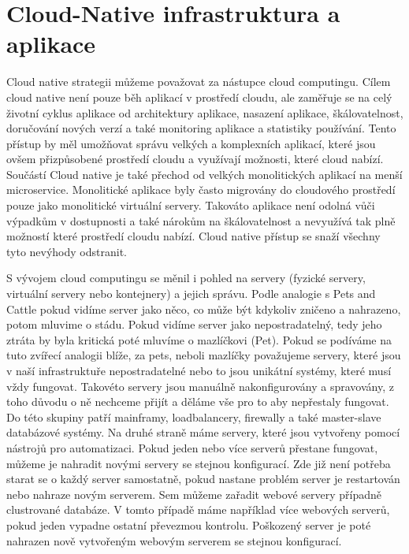 \chapter{Cloud-Native infrastruktura a aplikace}
Cloud native strategii můžeme považovat za nástupce cloud computingu. Cílem cloud native není pouze běh aplikací v prostředí cloudu, ale zaměřuje se na celý životní cyklus aplikace od architektury aplikace, nasazení aplikace, škálovatelnost, doručování nových verzí a také monitoring aplikace a statistiky používání. Tento přístup by měl umožňovat správu velkých a komplexních aplikací, které jsou ovšem přizpůsobené prostředí cloudu a využívají možnosti, které cloud nabízí. Součástí Cloud native je také přechod od velkých monolitických aplikací na menší microservice. Monolitické aplikace byly často migrovány do cloudového prostředí pouze jako monolitické virtuální servery. Takováto aplikace není odolná vůči výpadkům v dostupnosti a  také nárokům na škálovatelnost \cite{BRUNNER} a nevyužívá tak plně možností které prostředí cloudu nabízí. Cloud native přístup se snaží všechny tyto nevýhody odstranit. \par
    S vývojem cloud computingu se měnil i pohled na servery (fyzické servery, virtuální servery nebo kontejnery) a jejich správu. Podle analogie s Pets and Cattle \cite{petsvscattle} pokud vidíme server jako něco, co může být kdykoliv zničeno a nahrazeno, potom mluvime o stádu. Pokud vidíme server jako nepostradatelný, tedy jeho ztráta by byla kritická poté mluvíme o mazlíčkovi (Pet). Pokud se podíváme na tuto zvířecí analogii blíže, za pets, neboli mazlíčky považujeme servery, které jsou v naší infrastruktuře nepostradatelné nebo to jsou unikátní systémy, které musí vždy fungovat. Takovéto servery jsou manuálně nakonfigurovány a spravovány, z toho důvodu o ně nechceme přijít a děláme vše pro to aby nepřestaly fungovat. Do této skupiny patří mainframy, loadbalancery, firewally a také master-slave databázové systémy.  Na druhé straně máme servery, které jsou vytvořeny pomocí nástrojů pro automatizaci. Pokud jeden nebo více serverů přestane fungovat, můžeme je nahradit novými servery se stejnou konfigurací. Zde již není potřeba starat se o každý server samostatně, pokud nastane problém server je restartován nebo nahraze novým serverem. Sem můžeme zařadit webové servery případně clustrované databáze. V tomto případě máme například více webových serverů, pokud jeden vypadne ostatní převezmou kontrolu. Poškozený server je poté nahrazen nově vytvořeným webovým serverem se stejnou konfigurací. \par

